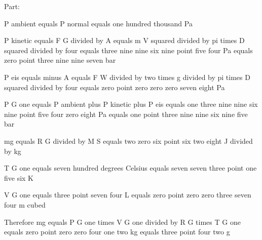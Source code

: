 Part:

P ambient equals P normal equals one hundred thousand Pa

P kinetic equals F G divided by A equals m V squared divided by pi times D squared divided by four equals three nine nine six nine point five four Pa equals zero point three nine nine seven bar

P eis equals minus A equals F W divided by two times g divided by pi times D squared divided by four equals zero point zero zero zero seven eight Pa

P G one equals P ambient plus P kinetic plus P eis equals one three nine nine six nine point five four zero eight Pa equals one point three nine nine six nine five bar

mg equals R G divided by M S equals two zero six point six two eight J divided by kg

T G one equals seven hundred degrees Celsius equals seven seven three point one five six K

V G one equals three point seven four L equals zero point zero zero three seven four m cubed

Therefore mg equals P G one times V G one divided by R G times T G one equals zero point zero zero four one two kg equals three point four two g